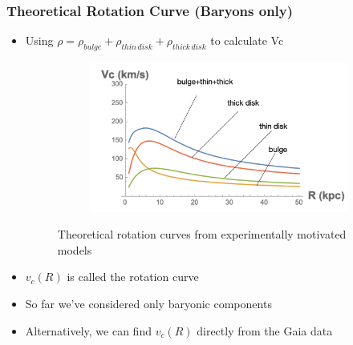 \documentclass{beamer}
\begin{document}
\begin{frame}
\frametitle{Theoretical Rotation Curve (Baryons only)}
\begin{itemize}
\item Using $\rho=\rho_{bulge}+\rho_{thin\, disk}+\rho_{thick\, disk}$ to calculate Vc

\begin{figure}[h!]
  \centering
  \begin{subfigure}[b]{0.65\linewidth}
    \includegraphics[width=\linewidth]{RotCurvTh252}
  \end{subfigure}
    \caption{Theoretical rotation curves from experimentally motivated models}
\end{figure}

\item $v_c(R)$ is called the rotation curve
\item So far we've considered only baryonic components
\item Alternatively, we can find $v_c(R)$ directly from the Gaia data

\end{itemize}
\end{frame}
\end{document}
